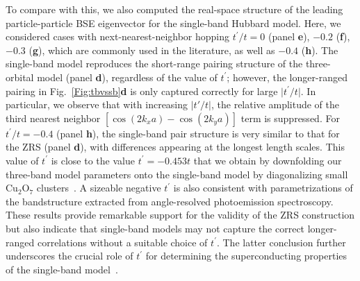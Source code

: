 \documentclass[fleqn,twocolumn,11pt]{wlscirep}
\begin{document}
To compare with this, we also computed the real-space structure of the leading particle-particle BSE eigenvector for the single-band Hubbard model. Here, we considered cases with next-nearest-neighbor hopping $t^\prime/t = 0$ (panel {\bf e}), $-0.2$ ({\bf f}), $-0.3$ ({\bf g}), which are commonly used in the literature, as well as $-0.4$ ({\bf h}). The single-band model reproduces the short-range pairing structure of the three-orbital model (panel {\bf d}), regardless of the value of $t^\prime$; however, the longer-ranged pairing in Fig.~\ref{Fig:tbvssb}{\bf d} is only captured correctly for large $\big|t^\prime/t \big|$. In particular, we observe that with increasing $\big|t'/t \big|$, the relative amplitude of the third nearest neighbor $[\cos(2k_xa)-\cos(2k_ya)]$ term is suppressed. For $t^\prime/t=-0.4$ (panel {\bf h}), the single-band pair structure is very similar to that for the ZRS (panel {\bf d}), with differences appearing at the longest length scales. This value of $t^\prime$ is close to the value $t^\prime=-0.453t$ that we obtain by downfolding our three-band model parameters onto the single-band model by diagonalizing small Cu$_2$O$_7$ clusters~\cite{Johnston2010,Eskes1991}. A sizeable negative $t^\prime$ is also consistent with parametrizations of the bandstructure extracted from angle-resolved photoemission spectroscopy\cite{ARPES}.  These results provide remarkable support for the validity of the ZRS construction but also indicate that single-band models may not capture the correct longer-ranged correlations without a suitable choice of $t^\prime$. The latter conclusion further underscores the crucial role of $t^\prime$ for determining the superconducting properties of the single-band model~\cite{Maier16, Macridin, Qin2019, Jiang2019}.
\end{document}

